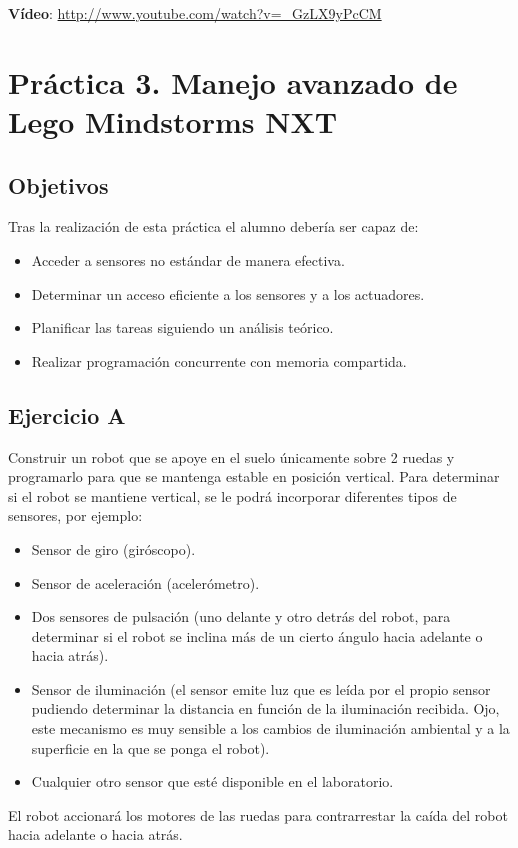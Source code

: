 \textbf{Vídeo}: \url{http://www.youtube.com/watch?v=_GzLX9yPcCM}

\chapter{Práctica 3. Manejo avanzado de Lego Mindstorms NXT}

\section{Objetivos}

Tras la realización de esta práctica el alumno debería ser capaz de:
\begin{itemize}
 \item Acceder a sensores no estándar de manera efectiva.
 \item Determinar un acceso eficiente a los sensores y a los actuadores.
 \item Planificar las tareas siguiendo un análisis teórico.
 \item Realizar programación concurrente con memoria compartida.
\end{itemize}

\section{Ejercicio A}
Construir un robot que se apoye en el suelo únicamente sobre 2 ruedas y programarlo para que se mantenga estable en posición vertical. 
Para determinar si el robot se mantiene vertical, se le podrá incorporar diferentes tipos de sensores, por ejemplo:
\begin{itemize}
\item Sensor de giro (giróscopo).
\item Sensor de aceleración (acelerómetro).
\item Dos sensores de pulsación (uno delante y otro detrás del robot, para determinar si el robot se inclina más de un cierto ángulo hacia adelante o hacia atrás).
\item Sensor de iluminación (el sensor emite luz que es leída por el propio sensor pudiendo determinar la distancia en función de la iluminación recibida. 
Ojo, este mecanismo es muy sensible a los cambios de iluminación ambiental y a la superficie en la que se ponga el robot).
\item Cualquier otro sensor que esté disponible en el laboratorio.
\end{itemize}

\par El robot accionará los motores de las ruedas para contrarrestar la caída del robot hacia adelante o hacia atrás.

